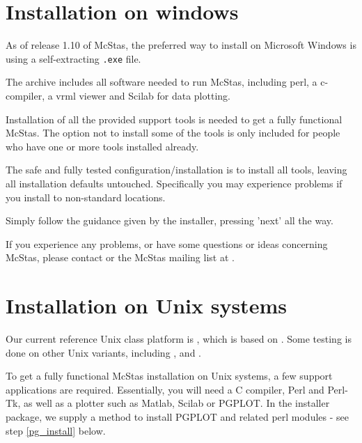 \section{Installation on windows}
\label{s:win32_install}
As of release 1.10 of McStas, the preferred way to install on
Microsoft Windows is using a self-extracting \texttt{.exe} file.

\noindent The archive includes all software needed to run McStas, including perl, a
c-compiler, a vrml viewer and Scilab for data plotting.

\noindent Installation of all the provided support tools is needed to get a fully
functional McStas. The option not to install some of the tools is only
included for people who have one or more tools installed already.

\noindent The safe and fully tested configuration/installation is to install all
tools, leaving all installation defaults untouched. Specifically you
may experience problems if you install to non-standard locations. 

\noindent Simply follow the guidance given by the installer, pressing 'next' all
the way.

\noindent If you experience any problems, or have some questions or ideas
concerning McStas, please contact
or the McStas mailing list at .


\section{Installation on Unix systems}
\label{s:unix_install}
Our current reference Unix class platform is
, which is
based on . Some testing is done on other
Unix variants, including ,
and .


\noindent To get a fully functional McStas installation on Unix systems, a few support
applications are required. Essentially, you will need a C compiler,
Perl and Perl-Tk, as well as a plotter such as Matlab, Scilab or
PGPLOT. In the installer package, we supply a method to install PGPLOT
and related perl modules - see step \ref{pg_install} below. 


